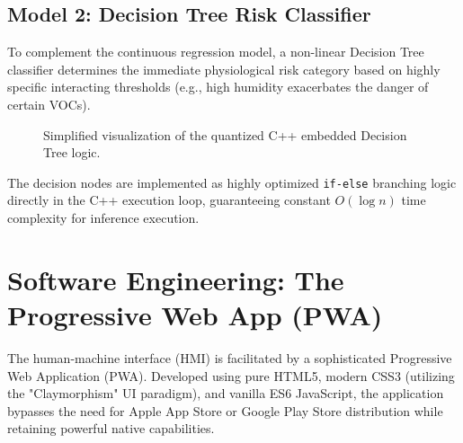 \documentclass[12pt,journal,onecolumn,a4paper]{IEEEtran}
\begin{document}
\subsection{Model 2: Decision Tree Risk Classifier}
To complement the continuous regression model, a non-linear Decision Tree classifier determines the immediate physiological risk category based on highly specific interacting thresholds (e.g., high humidity exacerbates the danger of certain VOCs).

\begin{figure}[htbp]
    \centering
    \caption{Simplified visualization of the quantized C++ embedded Decision Tree logic.}
    \label{fig:decisiontree}
\end{figure}

The decision nodes are implemented as highly optimized \texttt{if-else} branching logic directly in the C++ execution loop, guaranteeing constant $O(\log n)$ time complexity for inference execution.

\section{Software Engineering: The Progressive Web App (PWA)}
The human-machine interface (HMI) is facilitated by a sophisticated Progressive Web Application (PWA). Developed using pure HTML5, modern CSS3 (utilizing the "Claymorphism" UI paradigm), and vanilla ES6 JavaScript, the application bypasses the need for Apple App Store or Google Play Store distribution while retaining powerful native capabilities.
\end{document}

